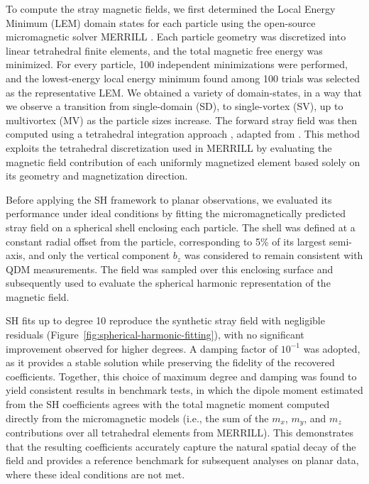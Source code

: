 To compute the stray magnetic fields, we first determined the Local Energy Minimum (LEM) domain states for each particle using the open-source micromagnetic solver \textsc{MERRILL} \citep[Micromagnetic Earth Related Robust Interpreted Language Laboratory,][]{Oconbhui-2018}. Each particle geometry was discretized into linear tetrahedral finite elements, and the total magnetic free energy was minimized. For every particle, 100 independent minimizations were performed, and the lowest-energy local energy minimum found among 100 trials was selected as the representative LEM. We obtained a variety of domain-states, in a way that we observe a transition from single-domain (SD), to single-vortex (SV), up to multivortex (MV) as the particle sizes increase. The forward stray field was then computed using a tetrahedral integration approach \citep{Bellon2026}, adapted from \citet{Fabbri-2008}. This method exploits the tetrahedral discretization used in \textsc{MERRILL} by evaluating the magnetic field contribution of each uniformly magnetized element based solely on its geometry and magnetization direction.

Before applying the SH framework to planar observations, we evaluated its performance under ideal conditions by fitting the micromagnetically predicted stray field on a spherical shell enclosing each particle. The shell was defined at a constant radial offset from the particle, corresponding to 5\% of its largest semi-axis, and only the vertical component $b_z$ was considered to remain consistent with QDM measurements. The field was sampled over this enclosing surface and subsequently used to evaluate the spherical harmonic representation of the magnetic field.

SH fits up to degree 10 reproduce the synthetic stray field with negligible residuals (Figure~\ref{fig:spherical-harmonic-fitting}), with no significant improvement observed for higher degrees. A damping factor of $10^{-1}$ was adopted, as it provides a stable solution while preserving the fidelity of the recovered coefficients. Together, this choice of maximum degree and damping was found to yield consistent results in benchmark tests, in which the dipole moment estimated from the SH coefficients agrees with the total magnetic moment computed directly from the micromagnetic models (i.e., the sum of the $m_x$, $m_y$, and $m_z$ contributions over all tetrahedral elements from \textsc{MERRILL}). This demonstrates that the resulting coefficients accurately capture the natural spatial decay of the field and provides a reference benchmark for subsequent analyses on planar data, where these ideal conditions are not met.

